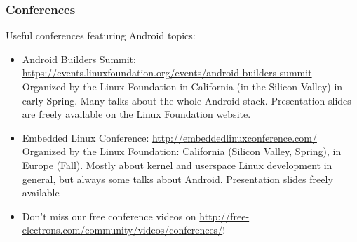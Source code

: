 \begin{frame}
  \frametitle{Conferences}
  Useful conferences featuring Android topics:
  \begin{itemize}
  \item Android Builders Summit:
    \url{https://events.linuxfoundation.org/events/android-builders-summit}\\
    Organized by the Linux Foundation in California (in the Silicon
    Valley) in early Spring. Many talks about the whole Android
    stack. Presentation slides are freely available on the Linux Foundation
    website.
  \item Embedded Linux Conference: \url{http://embeddedlinuxconference.com/}\\
    Organized by the Linux Foundation: California (Silicon Valley,
    Spring), in Europe (Fall). Mostly about kernel and userspace Linux
    development in general, but always some talks about
    Android. Presentation slides freely available
  \item Don't miss our free conference videos on
    \url{http://free-electrons.com/community/videos/conferences/}!
  \end{itemize}
\end{frame}
